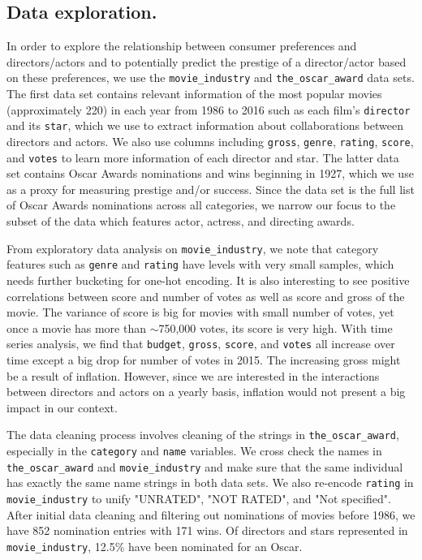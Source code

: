 \documentclass{article}
\begin{document}
\subsection{Data exploration.}
In order to explore the relationship between consumer preferences and directors/actors and to potentially predict the prestige of a director/actor based on these preferences, we use the \texttt{movie\_industry} and \texttt{the\_oscar\_award} data sets. The first data set contains relevant information of the most popular movies (approximately 220) in each year from 1986 to 2016 such as each film's \texttt{director} and its \texttt{star}, which we use to extract information about collaborations between directors and actors. We also use columns including \texttt{gross}, \texttt{genre}, \texttt{rating}, \texttt{score}, and \texttt{votes} to learn more information of each director and star. The latter data set contains Oscar Awards nominations and wins beginning in 1927, which we use as a proxy for measuring prestige and/or success. Since the data set is the full list of Oscar Awards nominations across all categories, we narrow our focus to the subset of the data which features actor, actress, and directing awards. 

From exploratory data analysis on \texttt{movie\_industry}, we note that category features such as \texttt{genre} and \texttt{rating} have levels with very small samples, which needs further bucketing for one-hot encoding. It is also interesting to see positive correlations between score and number of votes as well as score and gross of the movie. The variance of score is big for movies with small number of votes, yet once a movie has more than $\sim$750,000 votes, its score is very high. With time series analysis, we find that \texttt{budget}, \texttt{gross}, \texttt{score}, and \texttt{votes} all increase over time except a big drop for number of votes in 2015. The increasing gross might be a result of inflation. However, since we are interested in the interactions between directors and actors on a yearly basis, inflation would not present a big impact in our context.

The data cleaning process involves cleaning of the strings in \texttt{the\_oscar\_award}, especially in the \texttt{category} and \texttt{name} variables. We cross check the names in \texttt{the\_oscar\_award} and \texttt{movie\_industry} and make sure that the same individual has exactly the same name strings in both data sets. We also re-encode \texttt{rating} in  \texttt{movie\_industry} to unify "UNRATED", "NOT RATED", and "Not specified". After initial data cleaning and filtering out nominations of movies before 1986, we have 852 nomination entries with 171 wins. Of directors and stars represented in \texttt{movie\_industry}, 12.5\% have been nominated for an Oscar. 
\end{document}
